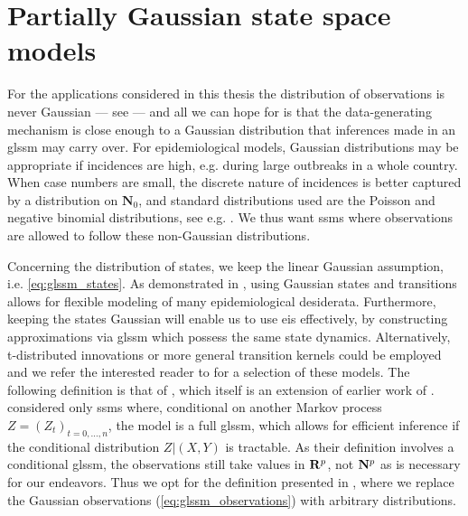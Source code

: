 \section{Partially Gaussian state space models}
\label{sec:logconcave_gaussian_state_space_models}

For the applications considered in this thesis the distribution of observations is never Gaussian --- see  --- and  all we can hope for is that the data-generating mechanism is close enough to a Gaussian distribution that inferences made in an \gls{glssm} may carry over.
For epidemiological models, Gaussian distributions may be appropriate if incidences are high, e.g. during large outbreaks in a whole country. 
When case numbers are small, the discrete nature of incidences is better captured by a distribution on $\mathbf N_{0}$, and standard distributions used are the Poisson and negative binomial distributions, see e.g. \citep{Lloyd-Smith2005Superspreadinga}.
We thus want \glspl{ssm} where observations are allowed to follow these non-Gaussian distributions. 

Concerning the distribution of states, we keep the linear Gaussian assumption, i.e. \eqref{eq:glssm_states}. As demonstrated in , using Gaussian states and transitions allows for flexible modeling of many epidemiological desiderata. Furthermore, keeping the states Gaussian will enable us to use \acrfull{eis} effectively, by constructing approximations via \gls{glssm} which possess the same state dynamics. Alternatively, t-distributed innovations or more general transition kernels could be employed and we refer the interested reader to \citep[Part II]{Durbin2012Time} for a selection of these models. The following definition is that of \citep{Koopman2019Modified}, which itself is an extension of earlier work of \citep{Shephard1994Partial}. \citet{Shephard1994Partial} considered only \glspl{ssm} where, conditional on another Markov process $Z = (Z_{t})_{t = 0, \dots, n}$, the model is a full \gls{glssm}, which allows for efficient inference if the conditional distribution $Z| (X, Y)$ is tractable. As their definition involves a conditional \gls{glssm}, the observations still take values in $\mathbf R^{p}$, not $\mathbf N^{p}$ as is necessary for our endeavors. Thus we opt for the definition presented in \citep{Koopman2019Modified}, where we replace the Gaussian observations (\eqref{eq:glssm_observations}) with arbitrary distributions.

